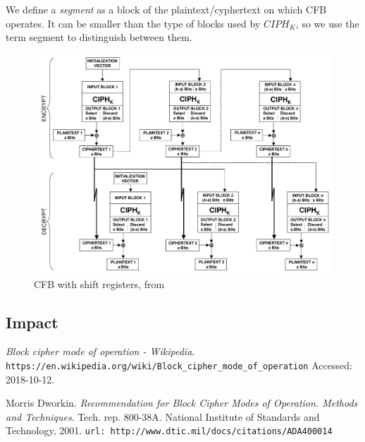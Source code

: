 \documentclass[11pt]{article}
\newcommand\CIPH{C\!I\!P\!H_K}
\begin{document}
We define a {\em segment} as a block of the plaintext/cyphertext on which CFB operates. It can be smaller than the type of blocks used by $\CIPH$, so we use the term segment to distinguish between them.



\begin{figure}[!ht]
  \centering
  \includegraphics[width=1\textwidth]{pic3-hw1-1692419}
  \caption{CFB with shift registers, from \cite{nist}}
  \label{fig:cfb_shift}
\end{figure}

\subsection{Impact}



\newpage
\begin{thebibliography}{99}

{\em Block cipher mode of operation - Wikipedia}.
  \verb|https://en.wikipedia.org/wiki/Block_cipher_mode_of_operation|
  \newblock Accessed: 2018-10-12.

Morris Dworkin.
  {\em Recommendation for Block Cipher Modes of Operation. Methods and Techniques}.
  Tech. rep. 800-38A. National Institute of Standards and Technology, 2001.
  \newblock \verb|url: http://www.dtic.mil/docs/citations/ADA400014|

\end{thebibliography}
\end{document}
